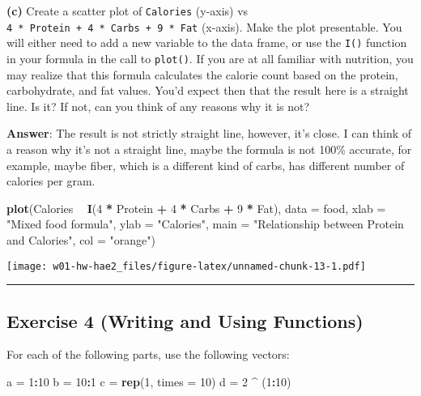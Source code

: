 \documentclass[]{article}
\newenvironment{Shaded}{\begin{snugshade}}{\end{snugshade}}
\newcommand{\KeywordTok}[1]{\textcolor[rgb]{0.13,0.29,0.53}{\textbf{#1}}}
\newcommand{\DataTypeTok}[1]{\textcolor[rgb]{0.13,0.29,0.53}{#1}}
\newcommand{\DecValTok}[1]{\textcolor[rgb]{0.00,0.00,0.81}{#1}}
\newcommand{\StringTok}[1]{\textcolor[rgb]{0.31,0.60,0.02}{#1}}
\newcommand{\OperatorTok}[1]{\textcolor[rgb]{0.81,0.36,0.00}{\textbf{#1}}}
\newcommand{\NormalTok}[1]{#1}
\begin{document}
\textbf{(c)} Create a scatter plot of \texttt{Calories} (y-axis) vs
\texttt{4\ *\ Protein\ +\ 4\ *\ Carbs\ +\ 9\ *\ Fat} (x-axis). Make the
plot presentable. You will either need to add a new variable to the data
frame, or use the \texttt{I()} function in your formula in the call to
\texttt{plot()}. If you are at all familiar with nutrition, you may
realize that this formula calculates the calorie count based on the
protein, carbohydrate, and fat values. You'd expect then that the result
here is a straight line. Is it? If not, can you think of any reasons why
it is not?

\textbf{Answer}: The result is not strictly straight line, however, it's
close. I can think of a reason why it's not a straight line, maybe the
formula is not 100\% accurate, for example, maybe fiber, which is a
different kind of carbs, has different number of calories per gram.

\begin{Shaded}
\begin{Highlighting}[]
\KeywordTok{plot}\NormalTok{(Calories }\OperatorTok{~}\StringTok{ }\KeywordTok{I}\NormalTok{(}\DecValTok{4} \OperatorTok{*}\StringTok{ }\NormalTok{Protein }\OperatorTok{+}\StringTok{ }\DecValTok{4} \OperatorTok{*}\StringTok{ }\NormalTok{Carbs }\OperatorTok{+}\StringTok{ }\DecValTok{9} \OperatorTok{*}\StringTok{ }\NormalTok{Fat), }\DataTypeTok{data =}\NormalTok{ food,}
     \DataTypeTok{xlab =} \StringTok{"Mixed food formula"}\NormalTok{,}
     \DataTypeTok{ylab =} \StringTok{"Calories"}\NormalTok{,}
     \DataTypeTok{main =} \StringTok{"Relationship between Protein and Calories"}\NormalTok{,}
     \DataTypeTok{col =} \StringTok{"orange"}\NormalTok{)}
\end{Highlighting}
\end{Shaded}

\texttt{[image: w01-hw-hae2\_files/figure-latex/unnamed-chunk-13-1.pdf]}

\begin{center}\rule{0.5\linewidth}{\linethickness}\end{center}

\subsection{Exercise 4 (Writing and Using
Functions)}\label{exercise-4-writing-and-using-functions}

For each of the following parts, use the following vectors:

\begin{Shaded}
\begin{Highlighting}[]
\NormalTok{a =}\StringTok{ }\DecValTok{1}\OperatorTok{:}\DecValTok{10}
\NormalTok{b =}\StringTok{ }\DecValTok{10}\OperatorTok{:}\DecValTok{1}
\NormalTok{c =}\StringTok{ }\KeywordTok{rep}\NormalTok{(}\DecValTok{1}\NormalTok{, }\DataTypeTok{times =} \DecValTok{10}\NormalTok{)}
\NormalTok{d =}\StringTok{ }\DecValTok{2} \OperatorTok{^}\StringTok{ }\NormalTok{(}\DecValTok{1}\OperatorTok{:}\DecValTok{10}\NormalTok{)}
\end{Highlighting}
\end{Shaded}
\end{document}

